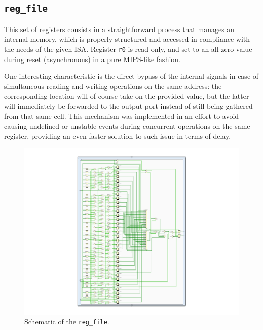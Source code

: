 \subsection{\texttt{reg\_file}}
This set of registers consists in a straightforward process that manages an internal memory, which is properly structured and accessed in compliance with the needs of the given ISA. Register \texttt{r0} is read-only, and set to an all-zero value during reset (asynchronous) in a pure MIPS-like fashion.

One interesting characteristic is the direct bypass of the internal signals in case of simultaneous reading and writing operations on the same address: the corresponding location will of course take on the provided value, but the latter will immediately be forwarded to the output port instead of still being gathered from that same cell. This mechanism was implemented in an effort to avoid causing undefined or unstable events during concurrent operations on the same register, providing an even faster solution to such issue in terms of delay.

\begin{figure}[!ht]
\centering
\includegraphics[width=\textwidth]{./chapters/figures/reg_file.pdf} 
\caption{Schematic of the \texttt{reg\_file}.}
\end{figure}

